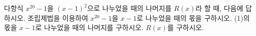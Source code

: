 다항식 $x^{20}-1$을 $(x-1)^2$으로 나누었을 때의 나머지를 $R(x)$라 할 때, 다음에 답하시오.
 조립제법을 이용하여 $x^{20}-1$을 $x-1$로 나누었을 때의 몫을 구하시오.
 (1)의 몫을 $x-1$로 나누었을 때의 나머지를 구하시오.
 $R(x)$를 구하시오.
